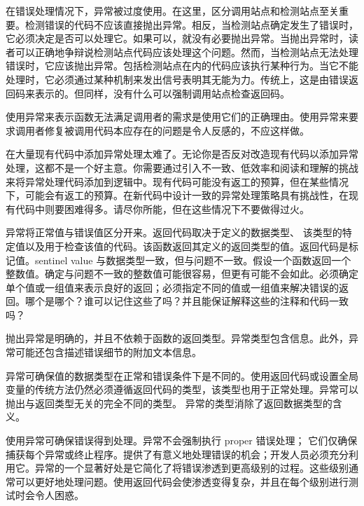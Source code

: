 
在错误处理情况下，异常被过度使用。在这里，区分调用站点和检测站点至关重要。检测错误的代码不应该直接抛出异常。相反，当检测站点确定发生了错误时，它必须决定是否可以处理它。如果可以，就没有必要抛出异常。当抛出异常时，读者可以正确地争辩说检测站点代码应该处理这个问题。然而，当检测站点无法处理错误时，它应该抛出异常。包括检测站点在内的代码应该执行某种行为。当它不能处理时，它必须通过某种机制来发出信号表明其无能为力。传统上，这是由错误返回码来表示的。但同样，没有什么可以强制调用站点检查返回码。

使用异常来表示函数无法满足调用者的需求是使用它们的正确理由。使用异常来要求调用者修复被调用代码本应存在的问题是令人反感的，不应这样做。


在大量现有代码中添加异常处理太难了。无论你是否反对改造现有代码以添加异常处理，这都不是一个好主意。你需要通过引入不一致、低效率和阅读和理解的挑战来将异常处理代码添加到逻辑中。现有代码可能没有返工的预算，但在某些情况下，可能会有返工的预算。在新代码中设计一致的异常处理策略具有挑战性，在现有代码中则要困难得多。请尽你所能，但在这些情况下不要做得过火。


异常将正常值与错误值区分开来。返回代码取决于定义的数据类型、 该类型的特定值以及用于检查该值的代码。该函数返回其定义的返回类型的值。返回代码是标记值。sentinel value 与数据类型一致，但与问题不一致。假设一个函数返回一个整数值。确定与问题不一致的整数值可能很容易，但更有可能不会如此。必须确定单个值或一组值来表示良好的返回；必须指定不同的值或一组值来解决错误的返回。哪个是哪个？谁可以记住这些了吗？并且能保证解释这些的注释和代码一致吗？

抛出异常是明确的，并且不依赖于函数的返回类型。异常类型包含信息。此外，异常可能还包含描述错误细节的附加文本信息。


异常可确保值的数据类型在正常和错误条件下是不同的。使用返回代码或设置全局变量的传统方法仍然必须遵循返回代码的类型，该类型也用于正常处理。异常可以抛出与返回类型无关的完全不同的类型。
异常的类型消除了返回数据类型的含义。


使用异常可确保错误得到处理。异常不会强制执行 proper 错误处理； 它们仅确保捕获每个异常或终止程序。提供了有意义地处理错误的机会；开发人员必须充分利用它。异常的一个显著好处是它简化了将错误渗透到更高级别的过程。这些级别通常可以更好地处理问题。使用返回代码会使渗透变得复杂，并且在每个级别进行测试时会令人困惑。


